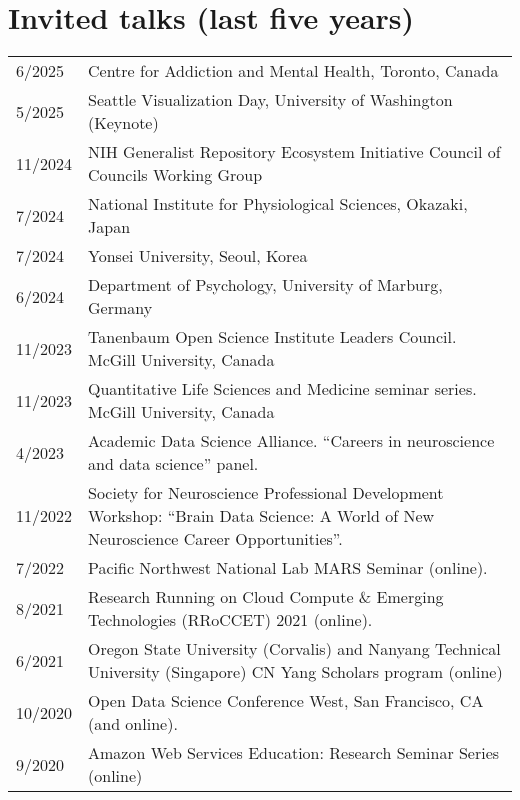\documentclass[11pt,fullpage]{article}
\begin{document}
\section*{Invited talks (last five years)}
  \begin{tabular}{p{}p{}}
  6/2025 & Centre for Addiction and Mental Health, Toronto, Canada \\
  5/2025 & Seattle Visualization Day, University of Washington (Keynote) \\
  11/2024 & NIH Generalist Repository Ecosystem Initiative Council of Councils Working Group \\
  7/2024 & National Institute for Physiological Sciences, Okazaki, Japan \\
  7/2024 & Yonsei University, Seoul, Korea \\
  6/2024 & Department of Psychology, University of Marburg, Germany \\
  11/2023 & Tanenbaum Open Science Institute Leaders Council. McGill University, Canada \\
  11/2023 & Quantitative Life Sciences and Medicine seminar series. McGill University, Canada \\
  4/2023 & Academic Data Science Alliance. ``Careers in neuroscience and data science'' panel. \\
  11/2022 & Society for Neuroscience Professional Development Workshop: ``Brain Data Science: A World of New Neuroscience Career Opportunities''.\\
  7/2022 & Pacific Northwest National Lab MARS Seminar (online).\\
  8/2021 & Research Running on Cloud Compute \& Emerging Technologies (RRoCCET) 2021 (online). \\
  6/2021 & Oregon State University (Corvalis) and Nanyang Technical University (Singapore) CN Yang Scholars program (online) \\
  10/2020 & Open Data Science Conference West, San Francisco, CA (and online). \\
  9/2020 & Amazon Web Services Education: Research Seminar Series (online) \\
  \end{tabular}
\end{document}
